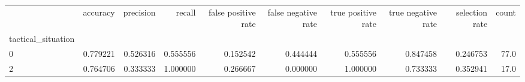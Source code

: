 \begin{tabular}{lrrrrrrrrr}
\toprule
{} &  accuracy &  precision &    recall &  false positive rate &  false negative rate &  true positive rate &  true negative rate &  selection rate &  count \\
tactical\_situation &           &            &           &                      &                      &                     &                     &                 &        \\
\midrule
0                  &  0.779221 &   0.526316 &  0.555556 &             0.152542 &             0.444444 &            0.555556 &            0.847458 &        0.246753 &   77.0 \\
2                  &  0.764706 &   0.333333 &  1.000000 &             0.266667 &             0.000000 &            1.000000 &            0.733333 &        0.352941 &   17.0 \\
\bottomrule
\end{tabular}
